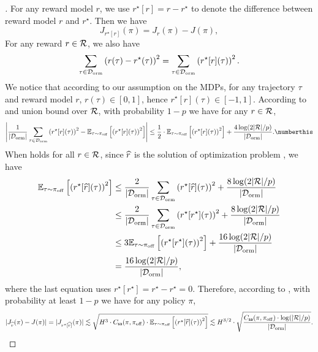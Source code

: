 \documentclass{article}
\begin{document}
\begin{proof}[]
    For any reward model $r$, we use $r^\star[r] = r - r^\star$ to denote the difference between reward model $r$ and $r^\star$. Then we have 
    $$J_{r^\star[r]}(\pi) = J_{r}(\pi) - J(\pi),$$
    For any reward $r\in \mathcal{R}$, we also have
    $$\sum_{\tau\in \mathcal{D}_{\mathrm{orm}}}\left(r(\tau) - r^\star(\tau)\right)^2 = \sum_{\tau\in \mathcal{D}_{\mathrm{orm}}}\left(r^\star[r](\tau)\right)^2.$$
    We notice that according to our assumption on the MDPs, for any trajectory $\tau$ and reward model $r$, $r(\tau)\in [0, 1]$, hence $r^\star[r](\tau)\in [-1, 1]$. According to \citet[Lemma A.3]{foster2021statistical} and union bound over $\mathcal{R}$, with probability $1 - p$ we have for any $r\in \mathcal{R}$,
    \begin{align*}
        \left|\frac{1}{|\calD_\orm|}\sum_{\tau\in \calD_\orm}\left(r^\star[r](\tau)\right)^2 - \EE_{\tau\sim \pioff}\left[\left(r^\star[r](\tau)\right)^2\right]\right| \le \frac{1}{2}\cdot \EE_{\tau\sim \pioff}\left[\left(r^\star[r](\tau)\right)^2\right] + \frac{4\log(2|\calR|/p)}{|\calD_\orm|}. \numberthis \label{eq: r-0-formula} 
    \end{align*}
    When  holds for all $r\in \mathcal{R}$, since $\widehat{r}$ is the solution of optimization problem , we have 
    \begin{align*} 
        \mathbb{E}_{\tau\sim \pi_{\mathrm{off}}}\left[\left(r^\star[\widehat{r}](\tau)\right)^2\right] & \le \frac{2}{|\mathcal{D}_{\mathrm{orm}}|}\sum_{\tau\in \mathcal{D}_{\mathrm{orm}}}\left(r^\star[\widehat{r}](\tau)\right)^2  + \frac{8\log(2|\mathcal{R}|/p)}{|\mathcal{D}_{\mathrm{orm}}|}\\
        & \le \frac{2}{|\mathcal{D}_{\mathrm{orm}}|}\sum_{\tau\in \mathcal{D}_{\mathrm{orm}}}\left(r^\star[r^\star](\tau)\right)^2  + \frac{8\log(2|\mathcal{R}|/p)}{|\mathcal{D}_{\mathrm{orm}}|}\\
        & \le 3\mathbb{E}_{\tau\sim \pi_{\mathrm{off}}}\left[\left(r^\star[r^\star](\tau)\right)^2\right] + \frac{16\log(2|\mathcal{R}|/p)}{|\mathcal{D}_{\mathrm{orm}}|}\\
        & = \frac{16\log(2|\mathcal{R}|/p)}{|\mathcal{D}_{\mathrm{orm}}|},
    \end{align*}
    where the last equation uses $r^\star[r^\star] = r^\star - r^\star = 0$. Therefore, according to , with probability at least $1 - p$ we have for any policy $\pi$,
    $$|J_{\widehat{r}}(\pi) - J(\pi)| = |J_{r^\star[\widehat{r}]}(\pi)|\lesssim \sqrt{H^3\cdot C_{\mathsf{sa}}(\pi, \pi_{\mathrm{off}})\cdot  \mathbb{E}_{\tau\sim \pi_{\mathrm{off}}}\left[\left(r^\star[\widehat{r}](\tau)\right)^2\right]}\lesssim H^{3/2}\cdot \sqrt{\frac{C_{\mathsf{sa}}(\pi, \pi_{\mathrm{off}})\cdot \log(|\mathcal{R}|/p)}{|\mathcal{D}_{\mathrm{orm}}|}}.$$
\end{proof}
\end{document}
